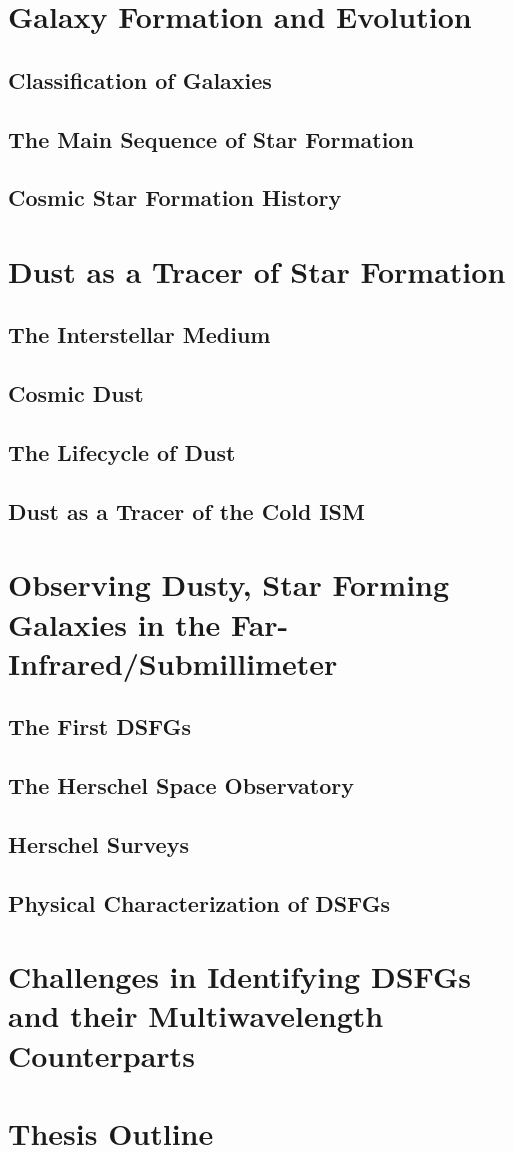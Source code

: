 \section{Galaxy Formation and Evolution}
\subsection{Classification of Galaxies}
\subsection{The Main Sequence of Star Formation}
\subsection{Cosmic Star Formation History}

\section{Dust as a Tracer of Star Formation}
\subsection{The Interstellar Medium}
\subsection{Cosmic Dust}
\subsection{The Lifecycle of Dust}
\subsection{Dust as a Tracer of the Cold ISM}

\section{Observing Dusty, Star Forming Galaxies in the Far-Infrared/Submillimeter}
\subsection{The First DSFGs}
\subsection{The Herschel Space Observatory}
\subsection{Herschel Surveys}
\subsection{Physical Characterization of DSFGs}

\section{Challenges in Identifying DSFGs and their Multiwavelength Counterparts}

\section{Thesis Outline}